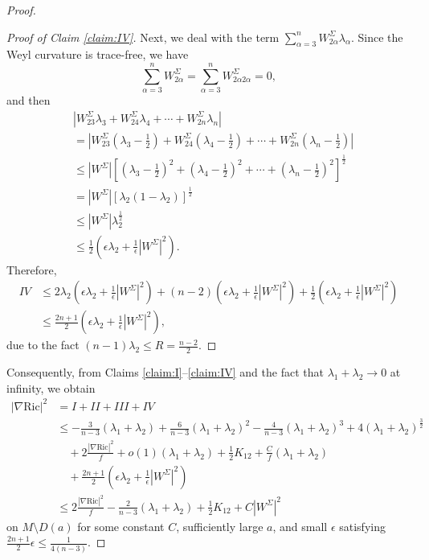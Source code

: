 \documentclass[10pt,a4paper]{amsart}
\begin{document}
\begin{proof}
\begin{proof}[Proof of Claim \ref{claim:IV}]
		Next, we deal with the term $\sum_{\alpha=3}^n W^{\Sigma}_{2\alpha}\lambda_{\alpha}$. Since the Weyl curvature is trace-free, we have
		\[
		\sum_{\alpha=3}^n W^{\Sigma}_{2\alpha} = \sum_{\alpha=3}^n W^{\Sigma}_{2\alpha 2\alpha} = 0,
		\]
		and then
		\begin{equation}\label{eq:w2a}
			\begin{aligned}
				&|W^{\Sigma}_{23}\lambda_{3} + W^{\Sigma}_{24}\lambda_{4} + \cdots + W^{\Sigma}_{2n}\lambda_{n}| \\
				&= \left|W^{\Sigma}_{23}\left(\lambda_{3} - \frac{1}{2}\right) + W^{\Sigma}_{24}\left(\lambda_{4} - \frac{1}{2}\right) + \cdots + W^{\Sigma}_{2n}\left(\lambda_{n} - \frac{1}{2}\right)\right| \\
				&\leq |W^{\Sigma}|\left[\left(\lambda_{3} - \frac{1}{2}\right)^2 + \left(\lambda_{4} - \frac{1}{2}\right)^2 + \cdots + \left(\lambda_{n} - \frac{1}{2}\right)^2\right]^{\frac{1}{2}} \\
				&= |W^{\Sigma}|[\lambda_{2}(1-\lambda_2)]^{\frac{1}{2}} \\
				&\leq |W^{\Sigma}|\lambda_{2}^{\frac{1}{2}} \\
				&\leq \frac{1}{2}\left(\epsilon\lambda_2 + \frac{1}{\epsilon}|W^{\Sigma}|^2\right).
			\end{aligned}
		\end{equation}
		Therefore,
		\begin{align*}
			IV &\leq 2\lambda_{2}\left(\epsilon\lambda_2 + \frac{1}{\epsilon}|W^{\Sigma}|^2\right) + (n-2)\left(\epsilon\lambda_2 + \frac{1}{\epsilon}|W^{\Sigma}|^2\right) + \frac{1}{2}\left(\epsilon\lambda_2 + \frac{1}{\epsilon}|W^{\Sigma}|^2\right) \\
			&\leq \frac{2n+1}{2}\left(\epsilon\lambda_2 + \frac{1}{\epsilon}|W^{\Sigma}|^2\right),
		\end{align*}
		due to the fact $(n-1)\lambda_{2} \leq R = \frac{n-2}{2}$.
	\end{proof}
	
	Consequently, from Claims \ref{claim:I}--\ref{claim:IV} and the fact that $\lambda_1+\lambda_2 \to 0$ at infinity, we obtain
	\begin{align*}
		|\nabla \mathrm{Ric}|^2 &= I + II + III + IV \\
		&\leq -\frac{3}{n-3}(\lambda_{1}+\lambda_{2}) + \frac{6}{n-3}(\lambda_{1}+\lambda_{2})^2 - \frac{4}{n-3}(\lambda_{1}+\lambda_{2})^3 + 4(\lambda_{1}+\lambda_{2})^{\frac{3}{2}} \\
		&\quad + 2\frac{|\nabla \mathrm{Ric}|^2}{f} + o(1)(\lambda_1+\lambda_2) + \frac{1}{2}K_{12} + \frac{C}{f}(\lambda_{1}+\lambda_{2}) \\
		&\quad + \frac{2n+1}{2}\left(\epsilon\lambda_2 + \frac{1}{\epsilon}|W^{\Sigma}|^2\right) \\
		&\leq 2\frac{|\nabla \mathrm{Ric}|^2}{f} - \frac{2}{n-3}(\lambda_1+\lambda_2) + \frac{1}{2}K_{12} + C|W^{\Sigma}|^2
	\end{align*}
	on $M \setminus D(a)$ for some constant $C$, sufficiently large $a$, and small $\epsilon$ satisfying $\frac{2n+1}{2}\epsilon \leq \frac{1}{4(n-3)}$.
	

\end{proof}
\end{document}
